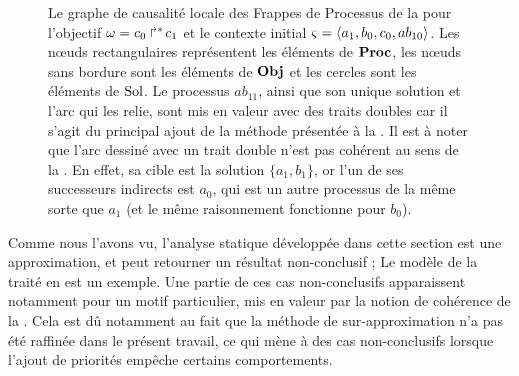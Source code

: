 \begin{example}
\begin{figure}[tp]
    \caption{%
      Le graphe de causalité locale des Frappes de Processus de la 
      pour l'objectif $\omega = \mbox{$c_0\Rsh^*\!c_1$}$
      et le contexte initial $\varsigma = \mbox{$\langle a_1, b_0, c_0, ab_{10} \rangle$}$.
      Les nœuds rectangulaires représentent les éléments de $\mathbf{Proc}$,
      les nœuds sans bordure sont les éléments de $\mathbf{Obj}$
      et les cercles sont les éléments de $\mathrm{Sol}$.
      Le processus $ab_{11}$, ainsi que son unique solution et l'arc qui les relie,
      sont mis en valeur avec des traits doubles car il s'agit du principal ajout de la méthode
      présentée à la .
      Il est à noter que l'arc dessiné avec un trait double n'est pas cohérent
      au sens de la .
      En effet, sa cible est la solution $\{ a_1, b_1 \}$,
      or l'un de ses successeurs indirects est $a_0$, qui est un autre processus de la même sorte
      que $a_1$ (et le même raisonnement fonctionne pour $b_0$).
    }
  \end{figure}
\end{example}



Comme nous l'avons vu, l'analyse statique développée dans cette section est une approximation,
et peut retourner un résultat non-conclusif ;
Le modèle de la  traité  en est un exemple.
Une partie de ces cas non-conclusifs apparaissent notamment pour un motif particulier,
mis en valeur par la notion de cohérence de la .
Cela est dû notamment au fait que la méthode de sur-approximation n'a pas été raffinée
dans le présent travail, ce qui mène à des cas non-conclusifs lorsque l'ajout de priorités
empêche certains comportements.

